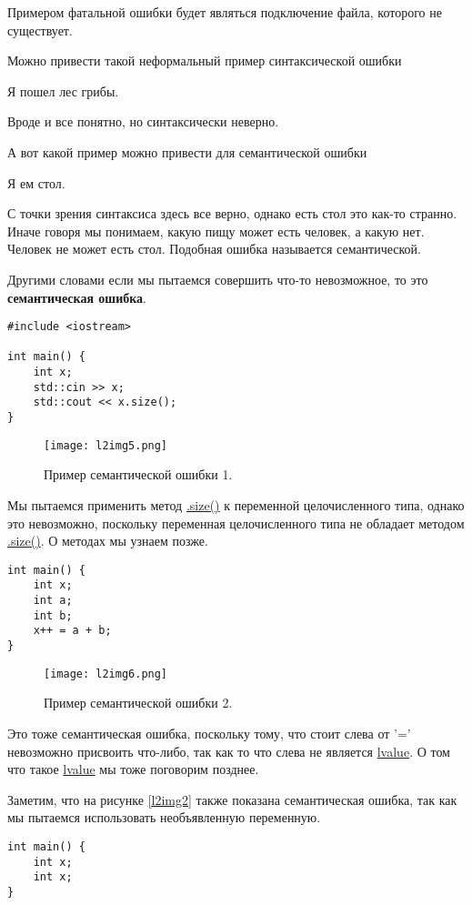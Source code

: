 Примером фатальной ошибки будет являться подключение файла, которого не существует.

Можно привести такой неформальный пример синтаксической ошибки
\begin{center}
Я пошел лес грибы.
\end{center}
Вроде и все понятно, но синтаксически неверно.

А вот какой пример можно привести для семантической ошибки
\begin{center}
Я ем стол.
\end{center}
С точки зрения синтаксиса здесь все верно, однако есть стол это как-то странно.
Иначе говоря мы понимаем, какую пищу может есть человек, а какую нет. Человек не может есть стол.
Подобная ошибка называется семантической.

Другими словами если мы пытаемся совершить что-то невозможное, то это \textbf{семантическая ошибка}.

\begin{verbatim}
#include <iostream>

int main() {
    int x;
    std::cin >> x;
    std::cout << x.size();
}
\end{verbatim}

\begin{figure}[h]
    \centering
    \texttt{[image: l2img5.png]}
    \caption{Пример семантической ошибки 1.}
    \label{l2img5}
\end{figure}

Мы пытаемся применить метод \underline{.size()} к переменной целочисленного типа,
однако это невозможно, поскольку переменная целочисленного типа не обладает методом \underline{.size()}.
О методах мы узнаем позже.

\begin{verbatim}
int main() {
    int x;
    int a;
    int b;
    x++ = a + b;
}
\end{verbatim}

\begin{figure}[h]
    \centering
    \texttt{[image: l2img6.png]}
    \caption{Пример семантической ошибки 2.}
    \label{l2img6}
\end{figure}

Это тоже семантическая ошибка, поскольку тому, что стоит слева от '='
невозможно присвоить что-либо, так как то что слева не является \underline{lvalue}.
О том что такое \underline{lvalue} мы тоже поговорим позднее.

Заметим, что на рисунке \ref{l2img2} также показана семантическая ошибка, так как мы пытаемся использовать необъявленную переменную.
\begin{verbatim}
int main() {
    int x;
    int x;
}
\end{verbatim}

